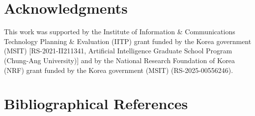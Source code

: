 \documentclass[10pt, a4paper]{article}
\begin{document}
\section{Acknowledgments}

This work was supported by the Institute of Information \& Communications Technology Planning \& Evaluation (IITP) grant funded by the Korea government (MSIT) [RS-2021-II211341, Artificial Intelligence Graduate School Program (Chung-Ang
University)] and by the National Research Foundation of Korea (NRF) grant funded by the Korea
government (MSIT) (RS-2025-00556246).


\section{Bibliographical References}\label{sec:reference}



\end{document}
